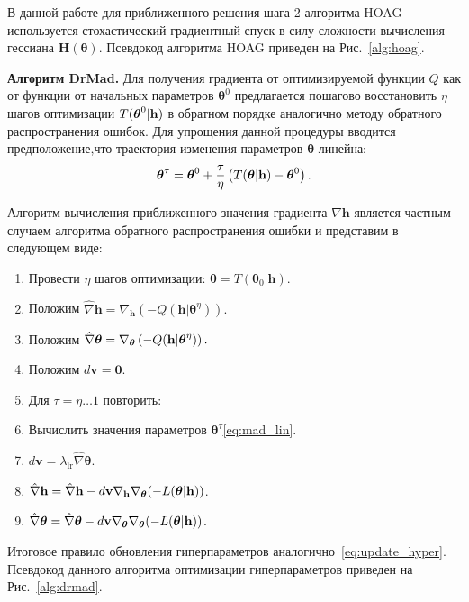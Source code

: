 В данной работе для приближенного решения  шага 2 алгоритма HOAG используется стохастический градиентный спуск в силу сложности вычисления гессиана $\mathbf{H}(\boldsymbol{\theta})$.
Псевдокод алгоритма HOAG приведен на Рис.~\ref{alg:hoag}.

\textbf{Алгоритм DrMad. }
Для получения градиента от оптимизируемой функции $Q$ как от функции от начальных параметров $\boldsymbol{\theta}^0$ предлагается пошагово восстановить $\eta$ шагов оптимизации $T(\boldsymbol{\theta}^0|\mathbf{h})$ в обратном порядке аналогично методу обратного распространения ошибок. Для упрощения данной процедуры вводится предположение,что траектория изменения параметров $\boldsymbol{\theta}$ линейна:
\begin{equation}
\label{eq:mad_lin}
\boldsymbol{\theta}^\tau = \boldsymbol{\theta}^0 + \frac{\tau}{\eta} \left(T(\boldsymbol{\theta}|\mathbf{h})- \boldsymbol{\theta}^0\right).
\end{equation}

Алгоритм вычисления приближенного значения градиента $\nabla \mathbf{h}$ является частным случаем алгоритма обратного распространения ошибки и представим в следующем виде:
\begin{enumerate}
\item Провести $\eta$ шагов оптимизации: $\boldsymbol{\theta} = T(\boldsymbol{\theta}_0| \mathbf{h})$.
\item Положим $\hat{\nabla} \mathbf{h} = \nabla_\mathbf{h} \left(-Q( \mathbf{h}| {\boldsymbol{\theta}}^\eta)\right).$
\item Положим $\hat{\nabla} \boldsymbol{\theta} = \nabla_{\boldsymbol{\theta}} \left(-Q( \mathbf{h}| {\boldsymbol{\theta}}^\eta)\right).$  
\item Положим $d\mathbf{v} = \mathbf{0}.$
\item Для $\tau = \eta \dots 1 $ повторить:
\item Вычислить значения параметров $\boldsymbol{\theta}^\tau$\eqref{eq:mad_lin}.
\item $d\mathbf{v} =   \lambda_{\text{lr}} \hat{\nabla} {\boldsymbol{\theta}}$.
\item $\hat{\nabla} \mathbf{h} =  \hat{\nabla} \mathbf{h} - d\mathbf{v}\nabla_{\mathbf{h}} \nabla_{\boldsymbol{\theta}} (-L(\boldsymbol{\theta}|\mathbf{h}))$.
\item $\hat{\nabla} \boldsymbol{\theta}  = \hat{\nabla} \boldsymbol{\theta}  - d\mathbf{v}\nabla_{\boldsymbol{\theta}} \nabla_{\boldsymbol{\theta}} (-L(\boldsymbol{\theta}|\mathbf{h}))$.
\end{enumerate}

Итоговое правило обновления гиперпараметров аналогично~\eqref{eq:update_hyper}.
Псевдокод данного алгоритма оптимизации гиперпараметров приведен на Рис.~\ref{alg:drmad}.

